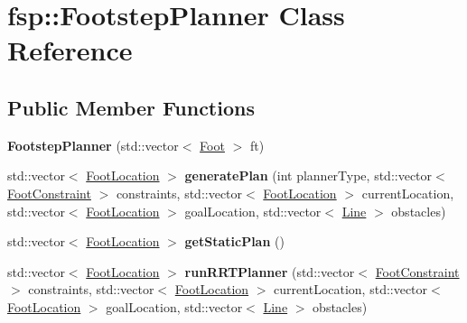 \hypertarget{classfsp_1_1_footstep_planner}{\section{fsp\-:\-:Footstep\-Planner Class Reference}
\label{classfsp_1_1_footstep_planner}
}
\subsection*{Public Member Functions}
\begin{DoxyCompactItemize}
\item 
\hypertarget{classfsp_1_1_footstep_planner_acfb85413cea1fad4a85bce702e82b622}{{\bfseries Footstep\-Planner} (std\-::vector$<$ \hyperlink{classfsp_1_1_foot}{Foot} $>$ ft)}\label{classfsp_1_1_footstep_planner_acfb85413cea1fad4a85bce702e82b622}

\item 
\hypertarget{classfsp_1_1_footstep_planner_a682d88e7c270fe0c7ce786664acdd70c}{std\-::vector$<$ \hyperlink{classfsp_1_1_foot_location}{Foot\-Location} $>$ {\bfseries generate\-Plan} (int planner\-Type, std\-::vector$<$ \hyperlink{classfsp_1_1_foot_constraint}{Foot\-Constraint} $>$ constraints, std\-::vector$<$ \hyperlink{classfsp_1_1_foot_location}{Foot\-Location} $>$ current\-Location, std\-::vector$<$ \hyperlink{classfsp_1_1_foot_location}{Foot\-Location} $>$ goal\-Location, std\-::vector$<$ \hyperlink{classfsp_1_1_line}{Line} $>$ obstacles)}\label{classfsp_1_1_footstep_planner_a682d88e7c270fe0c7ce786664acdd70c}

\item 
\hypertarget{classfsp_1_1_footstep_planner_a433849c6d7ee89da58b01ce17561552a}{std\-::vector$<$ \hyperlink{classfsp_1_1_foot_location}{Foot\-Location} $>$ {\bfseries get\-Static\-Plan} ()}\label{classfsp_1_1_footstep_planner_a433849c6d7ee89da58b01ce17561552a}

\item 
\hypertarget{classfsp_1_1_footstep_planner_a4a7bdf19aff74420bcfcb602f9e16241}{std\-::vector$<$ \hyperlink{classfsp_1_1_foot_location}{Foot\-Location} $>$ {\bfseries run\-R\-R\-T\-Planner} (std\-::vector$<$ \hyperlink{classfsp_1_1_foot_constraint}{Foot\-Constraint} $>$ constraints, std\-::vector$<$ \hyperlink{classfsp_1_1_foot_location}{Foot\-Location} $>$ current\-Location, std\-::vector$<$ \hyperlink{classfsp_1_1_foot_location}{Foot\-Location} $>$ goal\-Location, std\-::vector$<$ \hyperlink{classfsp_1_1_line}{Line} $>$ obstacles)}\label{classfsp_1_1_footstep_planner_a4a7bdf19aff74420bcfcb602f9e16241}


\end{DoxyCompactItemize}

